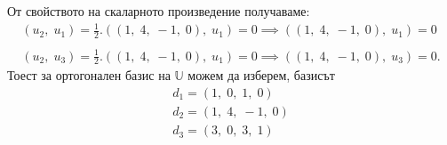 \documentclass[a4paper, 12pt]{article}
\begin{document}
    От свойството на скаларното произведение получаваме:
    \begin{align*}
        (u_2, \; u_1) = \frac{1}{2}.((1, \; 4, \; -1, \; 0), \; u_1) = 0 \implies ((1, \; 4, \; -1, \; 0), \; u_1) = 0 \\\\
        (u_2, \; u_3) = \frac{1}{2}.((1, \; 4, \; -1, \; 0), \; u_1) = 0 \implies ((1, \; 4, \; -1, \; 0), \; u_3) = 0.
    \end{align*}
    Тоест за ортогонален базис на $\mathbb{U}$ можем да изберем, базисът
    \begin{align*}
        d_1 = (1, \; 0, \; 1, \; 0) \\
        d_2 = (1, \; 4, \; -1, \; 0) \\
        d_3 = (3, \; 0, \; 3, \; 1)
    \end{align*}
\end{document}
